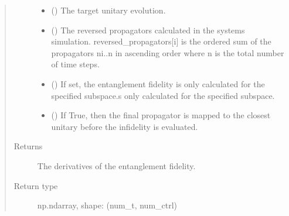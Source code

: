 \documentclass[letterpaper,10pt,english]{sphinxmanual}
\begin{document}
\begin{fulllineitems}
\begin{quote}
\begin{description}
\begin{itemize}
\item {} 
 () \textendash{} The target unitary evolution.

\item {} 
 (\sphinxstyleliteralemphasis{\sphinxupquote{{[}}}\sphinxstyleliteralemphasis{\sphinxupquote{{]}}}) \textendash{} The reversed propagators calculated in the systems simulation.
reversed\_propagators{[}i{]} is the ordered sum of the propagators n\sphinxhyphen{}i..n in
ascending order where n is the total number of time steps.

\item {} 
 (\sphinxstyleliteralemphasis{\sphinxupquote{{[}}}\sphinxstyleliteralemphasis{\sphinxupquote{{[}}}\sphinxstyleliteralemphasis{\sphinxupquote{{]}}}\sphinxstyleliteralemphasis{\sphinxupquote{{]}}}) \textendash{} If set, the entanglement fidelity is only calculated for the specified
subspace.s only calculated for the specified
subspace.

\item {} 
 () \textendash{} If True, then the final propagator is mapped to the closest unitary
before the infidelity is evaluated.

\end{itemize}

\item[{Returns}] \leavevmode
{} \textendash{} The derivatives of the entanglement fidelity.

\item[{Return type}] \leavevmode
np.ndarray, shape: (num\_t, num\_ctrl)

\end{description}\end{quote}

\end{fulllineitems}

\end{document}
